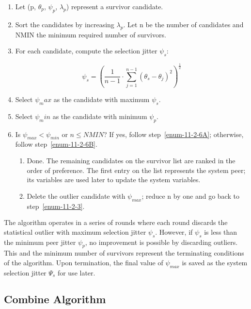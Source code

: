 \begin{enumerate}
  \item Let (p, $ \theta_p $, $ \psi_p $, $ \lambda_p $) represent a survivor candidate.

  \item Sort the candidates by increasing $ \lambda_p $. Let n be the number
    of candidates and NMIN the minimum required number of survivors.

  \item \label{enum-11-2-3} For each candidate, compute the selection jitter $ \psi_s $:

    $$
    \psi_s = \left( \frac{1}{n - 1} \cdot \sum^{n - 1}_{j = 1} (\theta_s - \theta_j)^2 \right)^{\frac{1}{2}}
    $$

  \item Select $ \psi_max $ as the candidate with maximum $ \psi_s $.
  \item Select $ \psi_min $ as the candidate with minimum $ \psi_p $.

  \item \label{enum-11-2-6} Is $ \psi_{max} < \psi_{min} $ or $ n \leq NMIN $? If yes, follow step~\ref{enum-11-2-6A};
    otherwise, follow step~\ref{enum-11-2-6B}.

    \begin{enumerate}
      \item \label{enum-11-2-6A} Done. The remaining candidates on the survivor list are ranked
      in the order of preference. The first entry on the list represents
      the system peer; its variables are used later to update the system
      variables.

      \item \label{enum-11-2-6B} Delete the outlier candidate with $ \psi_{max} $; reduce n by one and go
      back to step~\ref{enum-11-2-3}.
    \end{enumerate}
\end{enumerate}

The algorithm operates in a series of rounds where each round
discards the statistical outlier with maximum selection jitter $ \psi_s $.
However, if $ \psi_s $ is less than the minimum peer jitter $ \psi_p $, no
improvement is possible by discarding outliers. This and the minimum
number of survivors represent the terminating conditions of the
algorithm. Upon termination, the final value of $ \psi_{max} $ is saved as
the system selection jitter $ \Psi_s $ for use later.

\subsection{Combine Algorithm}
\label{section-11-2-3}

